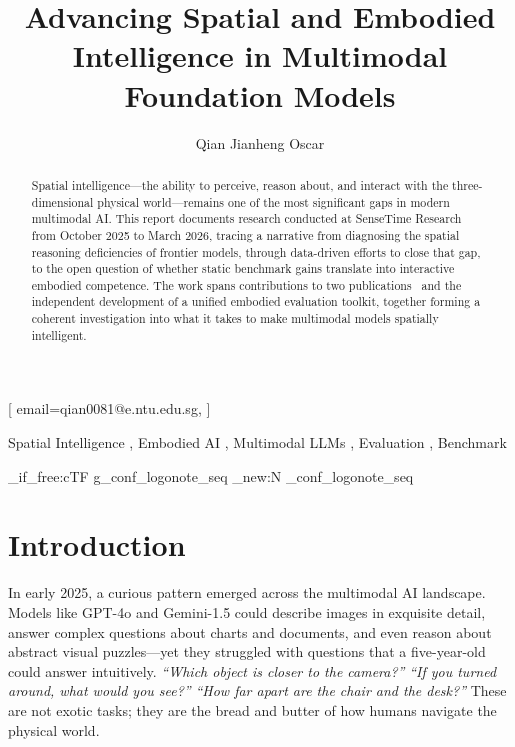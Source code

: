 \documentclass[
hf,
]{confart}
\begin{document}

\copyrightclause{}


\title{Advancing Spatial and Embodied Intelligence in Multimodal Foundation Models}

\author[1]{Qian Jianheng Oscar}[%
email=qian0081@e.ntu.edu.sg,
]

\address[1]{NTU}

\begin{abstract}
Spatial intelligence---the ability to perceive, reason about, and interact with the three-dimensional physical world---remains one of the most significant gaps in modern multimodal AI. This report documents research conducted at SenseTime Research from October 2025 to March 2026, tracing a narrative from diagnosing the spatial reasoning deficiencies of frontier models, through data-driven efforts to close that gap, to the open question of whether static benchmark gains translate into interactive embodied competence. The work spans contributions to two publications~\cite{cai2025holisticevaluationmultimodalllms, cai2025scalingspatialintelligencemultimodal} and the independent development of a unified embodied evaluation toolkit, together forming a coherent investigation into what it takes to make multimodal models spatially intelligent.
\end{abstract}

\begin{keywords}
  Spatial Intelligence \sep
  Embodied AI \sep
  Multimodal LLMs \sep
  Evaluation \sep
  Benchmark
\end{keywords}

\ExplSyntaxOn
\cs_if_free:cTF { g_conf_logonote_seq } { \seq_new:N \g_conf_logonote_seq } { }
\ExplSyntaxOff

\maketitle

\section{Introduction}
\label{sec:introduction}

In early 2025, a curious pattern emerged across the multimodal AI landscape. Models like GPT-4o and Gemini-1.5 could describe images in exquisite detail, answer complex questions about charts and documents, and even reason about abstract visual puzzles---yet they struggled with questions that a five-year-old could answer intuitively. \textit{``Which object is closer to the camera?''} \textit{``If you turned around, what would you see?''} \textit{``How far apart are the chair and the desk?''} These are not exotic tasks; they are the bread and butter of how humans navigate the physical world.
\end{document}
